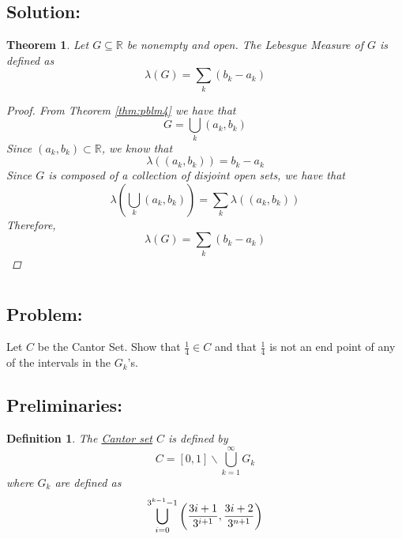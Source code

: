 \documentclass[]{article}
\newcommand{\R}{\mathbb{R}}
\newtheorem{definition}{Definition}
\newtheorem{theorem}{Theorem}
\begin{document}
\subsection*{Solution:}
\begin{theorem}
    Let $G \subseteq \R$ be nonempty and open. 
    The Lebesgue Measure of $G$ is defined as \[
        \lambda(G) = \sum_{k} (b_k - a_k)
    \]
    \begin{proof}
        From Theorem \ref{thm:pblm4} we have that \[
            G = \bigcup_{k} (a_k, b_k)
        \] Since $(a_k, b_k) \subset \R$, we know that \[
            \lambda((a_k, b_k)) = b_k - a_k
        \] Since $G$ is composed of a collection of disjoint open sets, we have that \[
            \lambda(\bigcup_{k} (a_k, b_k)) = \sum_{k} \lambda((a_k, b_k))
        \] Therefore, \[
            \lambda(G) = \sum_{k} (b_k - a_k)
        \]
    \end{proof}
\end{theorem}

\newpage
\section{}
\subsection*{Problem:}
Let $C$ be the Cantor Set. 
Show that $\frac{1}{4} \in C$ and that $\frac{1}{4}$ is not an end point of any of the intervals in the $G_k$'s.

\subsection*{Preliminaries:}
\begin{definition}
    The \underline{\emph{Cantor set}} $C$ is defined by \[
        C = [0,1] \backslash \bigcup_{k=1}^{\infty} G_k
    \] where $G_k$ are defined as \[
        \bigcup_{i=0}^{3^{k-1} - 1} \qty(\frac{3i + 1}{3^{i+1}}, \frac{3i + 2}{3^{n+1}})
    \]
\end{definition}
\end{document}
